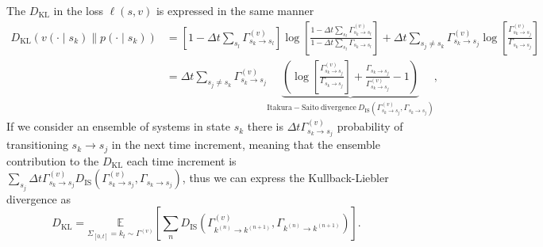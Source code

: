\noindent
The $D_{\mathrm{KL}}$ in the loss $\ell (s, v)$ is expressed in the same manner
\begin{equation}
	\begin{aligned}
		D_{\mathrm{KL}}(v(\cdot \mid s_k) \| p(\cdot \mid s_k))
		&=\left[1-\Delta t \sum_{s_l} \Gamma_{s_k \rightarrow s_l}^{(v)}\right] \log \left[\frac{1-\Delta t \sum_{s_l} \Gamma_{s_k \rightarrow s_l}^{(v)}}{1-\Delta t \sum_{s_l} \Gamma_{s_k \rightarrow s_l}}\right]+\Delta t \sum_{s_j \neq s_k} \Gamma_{s_k \rightarrow s_j}^{(v)} \log \left[\frac{\Gamma_{s_k \rightarrow s_j}^{(v)}}{\Gamma_{s_k \rightarrow s_j}}\right]\\
		&= \Delta t \sum_{s_j \neq s_k} \Gamma_{s_k \rightarrow s_j}^{(v)}\underbrace{\left(\log \left[\frac{\Gamma_{s_k \rightarrow s_j}^{(v)}}{\Gamma_{s_k \rightarrow s_j}}\right]+\frac{\Gamma_{s_k \rightarrow s_j}}{\Gamma_{s_k \rightarrow s_j}^{(v)}}-1\right)}_{\mathrm{Itakura-Saito~divergence~} D_{\mathrm{IS}}(\Gamma_{s_k \rightarrow s_j}^{(v)}, \Gamma_{s_k \rightarrow s_j})},
	\end{aligned}
\end{equation}
If we consider an ensemble of systems in state $s_k$ there is $\Delta t \Gamma_{s_k \rightarrow s_j}^{(v)}$ probability of transitioning $s_k \rightarrow s_j$ in the next time increment, meaning that the ensemble contribution to the $D_{\mathrm{KL}}$ each time increment is $\sum_{s_j} \Delta t \Gamma_{s_k \rightarrow s_j}^{(v)} D_{\mathrm{IS}}\left(\Gamma_{s_k \rightarrow s_j}^{(v)}, \Gamma_{s_k \rightarrow s_j}\right)$, thus we can express the Kullback-Liebler divergence as
\begin{equation}
	D_{\mathrm{KL}}=\underset{\Sigma_{[0, t]}=k_{t} \sim \Gamma^{(v)}}{\mathbb{E}}\left[\sum_{n} D_{\mathrm{IS}}\left(\Gamma_{k^{(n)} \rightarrow k^{(n+1)}}^{(v)}, \Gamma_{k^{(n)} \rightarrow k^{(n+1)}}\right)\right].
\end{equation}
